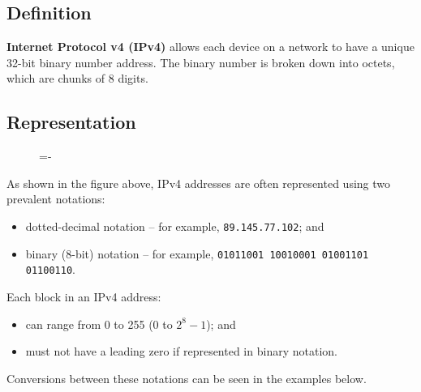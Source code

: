 \documentclass[a4paper]{systems-software}
\begin{document}
\subsection*{Definition}

\textbf{Internet Protocol v4 (IPv4)} allows each device on a network to have a unique 32-bit binary number address. The binary number is broken down into octets, which are chunks of 8 digits.


\subsection*{Representation}

\begin{figure}[H]
	\lineskip=-\fboxrule
\end{figure}

As shown in the figure above, IPv4 addresses are often represented using two prevalent notations:
\begin{itemize}
	\item dotted-decimal notation -- for example, \texttt{89.145.77.102}; and
	\item binary (8-bit) notation -- for example, \texttt{01011001 10010001 01001101 01100110}.
\end{itemize}

Each block in an IPv4 address:
\begin{itemize}
	\item can range from 0 to 255 (0 to $2^{8}-1$); and
	\item must not have a leading zero if represented in binary notation.
\end{itemize}

Conversions between these notations can be seen in the examples below.
\end{document}
